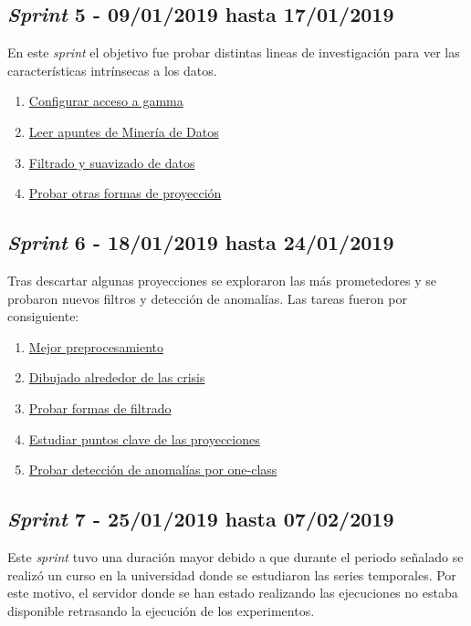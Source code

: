 \subsection{\textit{Sprint} 5 - 09/01/2019 hasta 17/01/2019}
En este \textit{sprint} el objetivo fue probar distintas lineas de investigación para ver las características intrínsecas a los datos.

\begin{enumerate}\addtocounter{enumi}{12}
	\item \href{https://github.com/joselucross/TFG-SmartBeds/issues/13}{ Configurar acceso a gamma}
	\item \href{https://github.com/joselucross/TFG-SmartBeds/issues/14}{ Leer apuntes de Minería de Datos}
	\item \href{https://github.com/joselucross/TFG-SmartBeds/issues/15}{ Filtrado y suavizado de datos}
	\item \href{https://github.com/joselucross/TFG-SmartBeds/issues/16}{ Probar otras formas de proyección}
\end{enumerate}	

\subsection{\textit{Sprint} 6 - 18/01/2019 hasta 24/01/2019}
Tras descartar algunas proyecciones se exploraron las más prometedores y se probaron nuevos filtros y detección de anomalías. Las tareas fueron por consiguiente:

\begin{enumerate}\addtocounter{enumi}{16}
	\item \href{https://github.com/joselucross/TFG-SmartBeds/issues/17}{ Mejor preprocesamiento}
	\item \href{https://github.com/joselucross/TFG-SmartBeds/issues/18}{ Dibujado alrededor de las crisis}
	\item \href{https://github.com/joselucross/TFG-SmartBeds/issues/19}{ Probar formas de filtrado}
	\item \href{https://github.com/joselucross/TFG-SmartBeds/issues/20}{ Estudiar puntos clave de las proyecciones}
	\item \href{https://github.com/joselucross/TFG-SmartBeds/issues/21}{ Probar detección de anomalías por one-class}
\end{enumerate}

\subsection{\textit{Sprint} 7 - 25/01/2019 hasta 07/02/2019}
Este \textit{sprint} tuvo una duración mayor debido a que durante el periodo señalado se realizó un curso en la universidad donde se estudiaron las series temporales. Por este motivo, el servidor donde se han estado realizando las ejecuciones no estaba disponible retrasando la ejecución de los experimentos.

